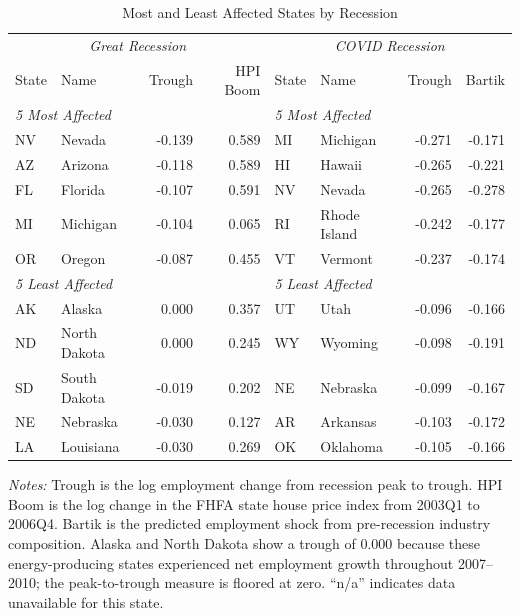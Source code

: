 \documentclass[12pt]{article}
\begin{document}
\begin{table}[H]
\centering
\caption{Most and Least Affected States by Recession}
\begin{threeparttable}
\small
\begin{tabular}{llrr|llrr}
\toprule
\multicolumn{4}{c}{\textit{Great Recession}} & \multicolumn{4}{c}{\textit{COVID Recession}} \\
State & Name & Trough & HPI Boom & State & Name & Trough & Bartik \\
\midrule
\multicolumn{4}{l}{\textit{5 Most Affected}} & \multicolumn{4}{l}{\textit{5 Most Affected}} \\
NV & Nevada & -0.139 & 0.589 & MI & Michigan & -0.271 & -0.171 \\
AZ & Arizona & -0.118 & 0.589 & HI & Hawaii & -0.265 & -0.221 \\
FL & Florida & -0.107 & 0.591 & NV & Nevada & -0.265 & -0.278 \\
MI & Michigan & -0.104 & 0.065 & RI & Rhode Island & -0.242 & -0.177 \\
OR & Oregon & -0.087 & 0.455 & VT & Vermont & -0.237 & -0.174 \\
\midrule
\multicolumn{4}{l}{\textit{5 Least Affected}} & \multicolumn{4}{l}{\textit{5 Least Affected}} \\
AK & Alaska & 0.000 & 0.357 & UT & Utah & -0.096 & -0.166 \\
ND & North Dakota & 0.000 & 0.245 & WY & Wyoming & -0.098 & -0.191 \\
SD & South Dakota & -0.019 & 0.202 & NE & Nebraska & -0.099 & -0.167 \\
NE & Nebraska & -0.030 & 0.127 & AR & Arkansas & -0.103 & -0.172 \\
LA & Louisiana & -0.030 & 0.269 & OK & Oklahoma & -0.105 & -0.166 \\
\bottomrule
\end{tabular}
\begin{tablenotes}[flushleft]
\small
\item \textit{Notes:} Trough is the log employment change from recession peak to trough. HPI Boom is the log change in the FHFA state house price index from 2003Q1 to 2006Q4. Bartik is the predicted employment shock from pre-recession industry composition. Alaska and North Dakota show a trough of 0.000 because these energy-producing states experienced net employment growth throughout 2007--2010; the peak-to-trough measure is floored at zero. ``n/a'' indicates data unavailable for this state.
\end{tablenotes}
\end{threeparttable}
\label{tab:states}
\end{table}
\end{document}
